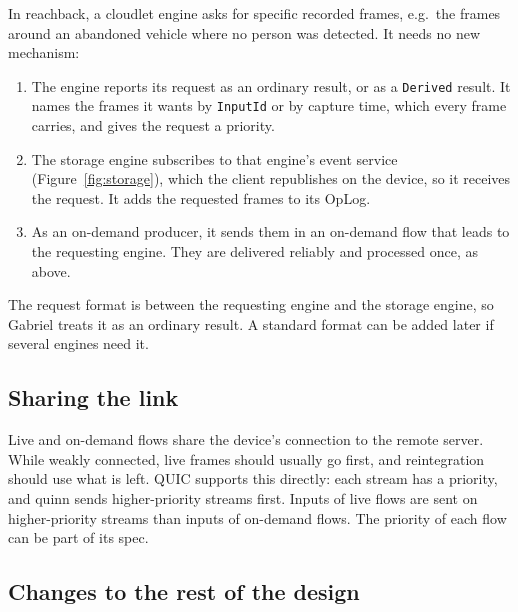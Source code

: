 \documentclass[11pt]{article}
\newcommand{\code}[1]{\texttt{#1}}
\begin{document}
In reachback, a cloudlet engine asks for specific recorded frames, e.g.\ the
frames around an abandoned vehicle where no person was detected. It needs no
new mechanism:
\begin{enumerate}[nosep]
  \item The engine reports its request as an ordinary result, or as a
        \code{Derived} result. It names the frames it wants by \code{InputId}
        or by capture time, which every frame carries, and gives the request a
        priority.
  \item The storage engine subscribes to that engine's event service
        (Figure~\ref{fig:storage}), which the client republishes on the
        device, so it receives the request. It adds the requested frames to
        its OpLog.
  \item As an on-demand producer, it sends them in an on-demand flow that
        leads to the requesting engine. They are delivered reliably and
        processed once, as above.
\end{enumerate}
The request format is between the requesting engine and the storage engine,
so Gabriel treats it as an ordinary result. A standard format can be added
later if several engines need it.

\subsection{Sharing the link}

Live and on-demand flows share the device's connection to the remote server.
While weakly connected, live frames should usually go first, and
reintegration should use what is left. QUIC supports this directly: each
stream has a priority, and quinn sends higher-priority streams first. Inputs
of live flows are sent on higher-priority streams than inputs of on-demand
flows. The priority of each flow can be part of its spec.

\subsection{Changes to the rest of the design}
\end{document}
